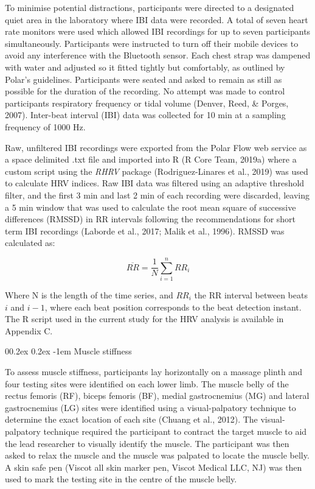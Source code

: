 \documentclass[
  english,
  man,floatsintext]{apa6}
\makeatletter
\renewcommand{\paragraph}{\@startsection{paragraph}{4}{\parindent}%
  {0\baselineskip \@plus 0.2ex \@minus 0.2ex}%
  {-1em}%
  {\normalfont\normalsize\bfseries\itshape\typesectitle}}
\makeatother
\begin{document}
To minimise potential distractions, participants were directed to a designated quiet area in the laboratory where IBI data were recorded.
A total of seven heart rate monitors were used which allowed IBI recordings for up to seven participants simultaneously.
Participants were instructed to turn off their mobile devices to avoid any interference with the Bluetooth sensor.
Each chest strap was dampened with water and adjusted so it fitted tightly but comfortably, as outlined by Polar's guidelines.
Participants were seated and asked to remain as still as possible for the duration of the recording.
No attempt was made to control participants respiratory frequency or tidal volume (Denver, Reed, \& Porges, 2007).
Inter-beat interval (IBI) data was collected for 10 min at a sampling frequency of 1000 Hz.

Raw, unfiltered IBI recordings were exported from the Polar Flow web service as a space delimited .txt file and imported into R (R Core Team, 2019a) where a custom script using the \emph{RHRV} package (Rodriguez-Linares et al., 2019) was used to calculate HRV indices.
Raw IBI data was filtered using an adaptive threshold filter, and the first 3 min and last 2 min of each recording were discarded, leaving a 5 min window that was used to calculate the root mean square of successive differences (RMSSD) in RR intervals following the recommendations for short term IBI recordings (Laborde et al., 2017; Malik et al., 1996). RMSSD was calculated as:

\begin{equation} 
  \overline{RR} = \frac{1}{N} \sum_{i=1}^{n} RR_i
  \label{eq:rmssd}
\end{equation}

Where N is the length of the time series, and \(RR_i\) the RR interval between beats \(i\) and \(i-1\), where each beat position corresponds to the beat detection instant.
The R script used in the current study for the HRV analysis is available in Appendix C.

\hypertarget{muscle-stiffness-1}{%
\paragraph{Muscle stiffness}\label{muscle-stiffness-1}}

To assess muscle stiffness, participants lay horizontally on a massage plinth and four testing sites were identified on each lower limb.
The muscle belly of the rectus femoris (RF), biceps femoris (BF), medial gastrocnemius (MG) and lateral gastrocnemius (LG) sites were identified using a visual-palpatory technique to determine the exact location of each site (Chuang et al., 2012).
The visual-palpatory technique required the participant to contract the target muscle to aid the lead researcher to visually identify the muscle.
The participant was then asked to relax the muscle and the muscle was palpated to locate the muscle belly.
A skin safe pen (Viscot all skin marker pen, Viscot Medical LLC, NJ) was then used to mark the testing site in the centre of the muscle belly.
\end{document}

